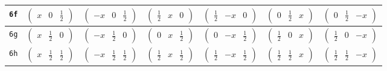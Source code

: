 \documentclass[fleqn,9pt,landscape]{jsarticle}
\begin{document}
\begin{center}
\begin{longtable}{ccccccc}
{\tt 6f} & $ \begin{pmatrix} x & 0 & \frac{1}{2} \end{pmatrix} $ & $ \begin{pmatrix} - x & 0 & \frac{1}{2} \end{pmatrix} $ & $ \begin{pmatrix} \frac{1}{2} & x & 0 \end{pmatrix} $ & $ \begin{pmatrix} \frac{1}{2} & - x & 0 \end{pmatrix} $ & $ \begin{pmatrix} 0 & \frac{1}{2} & x \end{pmatrix} $ & $ \begin{pmatrix} 0 & \frac{1}{2} & - x \end{pmatrix} $ \\ \hline
{\tt 6g} & $ \begin{pmatrix} x & \frac{1}{2} & 0 \end{pmatrix} $ & $ \begin{pmatrix} - x & \frac{1}{2} & 0 \end{pmatrix} $ & $ \begin{pmatrix} 0 & x & \frac{1}{2} \end{pmatrix} $ & $ \begin{pmatrix} 0 & - x & \frac{1}{2} \end{pmatrix} $ & $ \begin{pmatrix} \frac{1}{2} & 0 & x \end{pmatrix} $ & $ \begin{pmatrix} \frac{1}{2} & 0 & - x \end{pmatrix} $ \\ \hline
{\tt 6h} & $ \begin{pmatrix} x & \frac{1}{2} & \frac{1}{2} \end{pmatrix} $ & $ \begin{pmatrix} - x & \frac{1}{2} & \frac{1}{2} \end{pmatrix} $ & $ \begin{pmatrix} \frac{1}{2} & x & \frac{1}{2} \end{pmatrix} $ & $ \begin{pmatrix} \frac{1}{2} & - x & \frac{1}{2} \end{pmatrix} $ & $ \begin{pmatrix} \frac{1}{2} & \frac{1}{2} & x \end{pmatrix} $ & $ \begin{pmatrix} \frac{1}{2} & \frac{1}{2} & - x \end{pmatrix} $ \\ \hline

\end{longtable}
\end{center}
\end{document}
